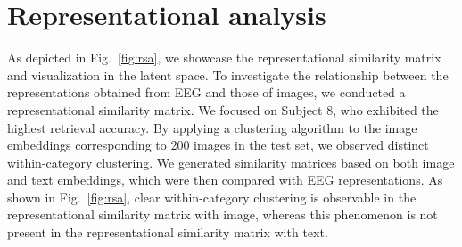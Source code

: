 \documentclass{article}
\begin{document}
\begin{table}[h]
\centering
\caption{Quantitative comparison results of image reconstruction in Subject 8 via our framework using different encoders.}
\label{tab:generation_comparison_encoders}
\setlength{\tabcolsep}{4pt} %
\end{table}



\section{Representational analysis}
\label{sec:RSA}

As depicted in Fig.~\ref{fig:rsa}, we showcase the representational similarity matrix and visualization in the latent space. To investigate the relationship between the representations obtained from EEG and those of images, we conducted a representational similarity matrix. We focused on Subject 8, who exhibited the highest retrieval accuracy. By applying a clustering algorithm to the image embeddings corresponding to 200 images in the test set, we observed distinct within-category clustering. We generated similarity matrices based on both image and text embeddings, which were then compared with EEG representations. As shown in Fig.~\ref{fig:rsa}, clear within-category clustering is observable in the representational similarity matrix with image, whereas this phenomenon is not present in the representational similarity matrix with text.
\end{document}
